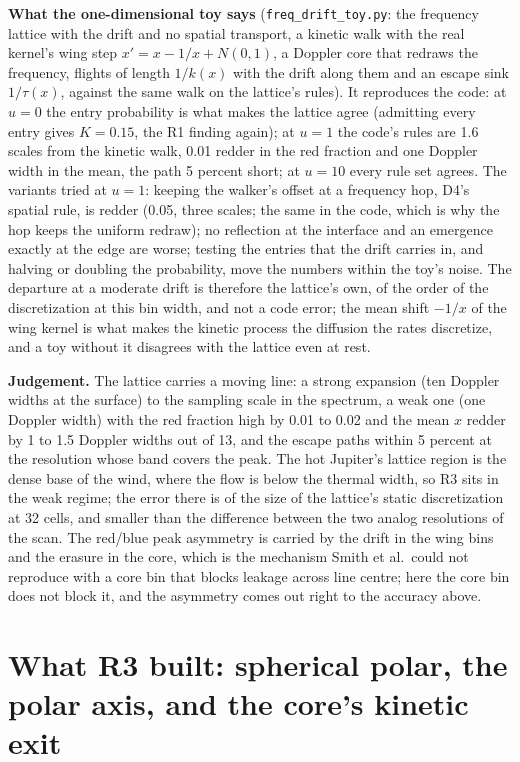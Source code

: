 \documentclass[11pt]{article}
\begin{document}
\textbf{What the one-dimensional toy says} (\texttt{freq\_drift\_toy.py}: the
frequency lattice with the drift and no spatial transport, a kinetic walk with the
real kernel's wing step $x' = x - 1/x + N(0,1)$, a Doppler core that redraws the
frequency, flights of length $1/k(x)$ with the drift along them and an escape sink
$1/\tau(x)$, against the same walk on the lattice's rules).  It reproduces the code:
at $u = 0$ the entry probability is what makes the lattice agree (admitting every
entry gives $K = 0.15$, the R1 finding again); at $u = 1$ the code's rules are 1.6
scales from the kinetic walk, 0.01 redder in the red fraction and one Doppler width
in the mean, the path 5 percent short; at $u = 10$ every rule set agrees.  The
variants tried at $u = 1$: keeping the walker's offset at a frequency hop, D4's
spatial rule, is redder (0.05, three scales; the same in the code, which is why the
hop keeps the uniform redraw); no reflection at the interface and an emergence
exactly at the edge are worse; testing the entries that the drift carries in, and
halving or doubling the probability, move the numbers within the toy's noise.  The
departure at a moderate drift is therefore the lattice's own, of the order of the
discretization at this bin width, and not a code error; the mean shift $-1/x$ of the
wing kernel is what makes the kinetic process the diffusion the rates discretize, and
a toy without it disagrees with the lattice even at rest.

\textbf{Judgement.}  The lattice carries a moving line: a strong expansion
(ten Doppler widths at the surface) to the sampling scale in the spectrum, a weak one
(one Doppler width) with the red fraction high by 0.01 to 0.02 and the mean $x$ redder
by 1 to 1.5 Doppler widths out of 13, and the escape paths within 5 percent at the
resolution whose band covers the peak.  The hot Jupiter's lattice region is the dense
base of the wind, where the flow is below the thermal width, so R3 sits in the weak
regime; the error there is of the size of the lattice's static discretization at 32
cells, and smaller than the difference between the two analog resolutions of the
scan.  The red/blue peak asymmetry is carried by the drift in the wing bins and the
erasure in the core, which is the mechanism Smith et al.\ could not reproduce with a
core bin that blocks leakage across line centre; here the core bin does not block it,
and the asymmetry comes out right to the accuracy above.

\section{What R3 built: spherical polar, the polar axis, and the core's kinetic exit}
\label{sec:r3}
\end{document}
